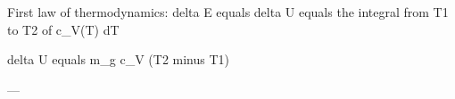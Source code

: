 First law of thermodynamics:  
delta E equals delta U equals the integral from T1 to T2 of c_V(T) dT  

delta U equals m_g c_V (T2 minus T1)  

---